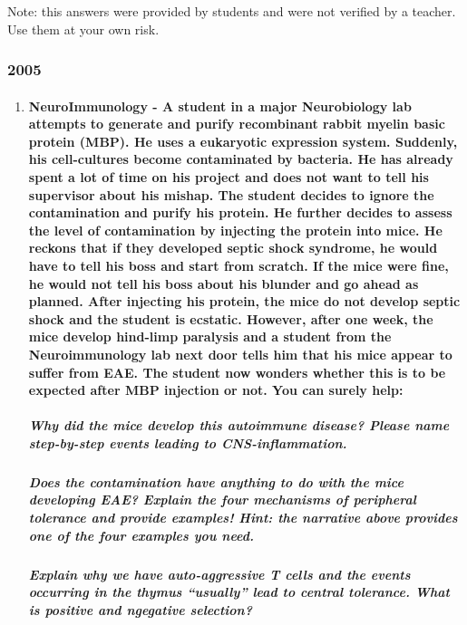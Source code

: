 \documentclass[12pt,article,oneside,a4paper]{memoir}
\begin{document}
Note: this answers were provided by students and were not verified by a teacher. Use them at your own risk.

\subsubsection{2005}
\begin{enumerate}
\item \paragraph{NeuroImmunology - A student in a major Neurobiology lab attempts to generate and purify recombinant rabbit myelin basic protein (MBP).  He uses a eukaryotic expression system.  Suddenly, his cell-cultures become contaminated by bacteria.  He has already spent a lot of time on his project and does not want to tell his supervisor about his mishap.  The student decides to ignore the contamination and purify his protein.  He further decides to assess the level of contamination by injecting the protein into mice.  He reckons that if they developed septic shock syndrome, he would have to tell his boss and start from scratch.  If the mice were fine, he would not tell his boss about his blunder and go ahead as planned. After injecting his protein, the mice do not develop septic shock and the student is ecstatic.  However, after one week, the mice develop hind-limp paralysis and a student from the Neuroimmunology lab next door tells him that his mice appear to suffer from EAE.  The student now wonders whether this is to be expected after MBP injection or not.  You can surely help:}
\subparagraph{Why did the mice develop this autoimmune disease?  Please name step-by-step events leading to CNS-inflammation.}
\subparagraph{Does the contamination have anything to do with the mice developing EAE?  Explain the four mechanisms of peripheral tolerance and provide examples!  Hint: the narrative above provides one of the four examples you need.}
\subparagraph{Explain why we have auto-aggressive T cells and the events occurring in the thymus “usually” lead to central tolerance.  What is positive and ngegative selection?}


\end{enumerate}
\end{document}
